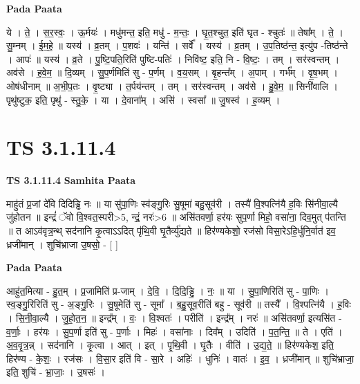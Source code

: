 \documentclass[17pt]{extarticle}
\begin{document}
\textbf{Pada Paata} \newline

ये । ते॒ । स॒र॒स्वः॒ । ऊ॒र्मयः॑ । मधु॑मन्त॒ इति॒ मधु॑ - म॒न्तः॒ । घृ॒त॒श्चुत॒ इति॑ घृत - श्चुतः॑ ॥ तेषा᳚म् । ते॒ । सु॒म्नम् । ई॒म॒हे॒ ॥ यस्य॑ । व्र॒तम् । प॒शवः॑ । यन्ति॑ । सर्वे᳚ । यस्य॑ । व्र॒तम् । उ॒प॒तिष्ठ॑न्त॒ इत्यु॑प -तिष्ठ॑न्ते । आपः॑ ॥ यस्य॑ । व्र॒ते । पु॒ष्टि॒पति॒रिति॑ पुष्टि-पतिः॑ । निवि॑ष्ट॒ इति॒ नि - वि॒ष्टः॒ । तम् । सर॑स्वन्तम् । अव॑से । ह॒वे॒म॒ ॥ दि॒व्यम् । सु॒प॒र्णमिति॑ सु - प॒र्णम् । व॒य॒सम् । बृ॒हन्त᳚म् । अ॒पाम् । गर्भ᳚म् । वृ॒ष॒भम् । ओष॑धीनाम् ॥ अ॒भी॒प॒तः । वृ॒ष्ट्या । त॒र्पय॑न्तम् । तम् । सर॑स्वन्तम् । अव॑से । हु॒वे॒म॒ ॥ सिनी॑वालि । पृथु॑ष्टुक॒ इति॒ पृथु॑ - स्तु॒के॒ । या । दे॒वाना᳚म् । असि॑ । स्वसा᳚ ॥ जु॒षस्व॑ । ह॒व्यम् ।  \newline




\section*{ TS 3.1.11.4 }

\textbf{TS 3.1.11.4 } \newline
\textbf{Samhita Paata} \newline

माहु॑तं प्र॒जां दे॑वि दिदिड्ढि नः ॥ या सु॑पा॒णिः स्व॑ङ्गु॒रिः सु॒षूमा॑ बहु॒सूव॑री । तस्यै॑ वि॒श्पत्नि॑यै ह॒विः सि॑नीवा॒ल्यै जु॑होतन ॥ इन्द्रं॑ ॅवो वि॒श्वत॒स्परी>5, न्द्रं॒ नरः॑>6 ॥ असि॑तवर्णा॒ हर॑यः सुप॒र्णा मिहो॒ वसा॑ना॒ दिव॒मुत् प॑तन्ति ॥ त आऽव॑वृत्र॒न्थ् सद॑नानि कृ॒त्वाऽऽदित् पृ॑थि॒वी घृ॒तैर्व्यु॑द्यते ॥ हिर॑ण्यकेशो॒ रज॑सो विसा॒रेऽहि॒र्धुनि॒र्वात॑ इव॒ ध्रजी॑मान् । शुचि॑भ्राजा उ॒षसो॒ - [  ] \newline

\textbf{Pada Paata} \newline

आहु॑त॒मित्या - हु॒त॒म् । प्र॒जामिति॑ प्र-जाम् । दे॒वि॒ । दि॒दि॒ड्ढि॒ । नः॒ ॥ या । सु॒पा॒णिरिति॑ सु - पा॒णिः । स्व॒ङ्गु॒रिरिति॑ सु - अ॒ङ्गु॒रिः । सु॒षूमेति॑ सु - सूमा᳚ । ब॒हु॒सूव॒रीति॑ बहु - सूव॑री ॥ तस्यै᳚ । वि॒श्पत्नि॑यै । ह॒विः । सि॒नी॒वा॒ल्यै । जु॒हो॒त॒न॒ ॥ इन्द्र᳚म् । वः॒ । वि॒श्वतः॑ । परीति॑ । इन्द्र᳚म् । नरः॑ ॥ असि॑तवर्णा॒ इत्यसि॑त - व॒र्णाः॒ । हर॑यः । सु॒प॒र्णा इति॑ सु - प॒र्णाः । मिहः॑ । वसा॑नाः । दिव᳚म् । उदिति॑ । प॒त॒न्ति॒ ॥ ते । एति॑ । अ॒व॒वृ॒त्र॒न्न् । सद॑नानि । कृ॒त्वा । आत् । इत् । पृ॒थि॒वी । घृ॒तैः । वीति॑ । उ॒द्य॒ते॒ ॥ हिर॑ण्यकेश॒ इति॒ हिर॑ण्य - के॒शः॒ । रज॑सः । वि॒सा॒र इति॑ वि - सा॒रे । अहिः॑ । धुनिः॑ । वातः॑ । इ॒व॒ । ध्रजी॑मान् ॥ शुचि॑भ्राजा॒ इति॒ शुचि॑ - भ्रा॒जाः॒ । उ॒षसः॑ ।  \newline
\end{document}
